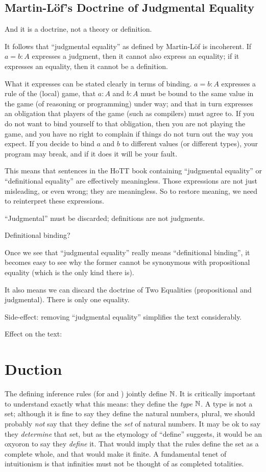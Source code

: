 \documentclass{article}
\begin{document}
\subsection{Martin-Löf's Doctrine of Judgmental Equality}

And it is a doctrine, not a theory or definition.

It follows that ``judgmental equality'' as defined by Martin-Löf is
incoherent. If \(a=b:A\) expresses a judgment, then it cannot also
express an equality; if it expresses an equality, then it cannot be a
definition.

What it expresses can be stated clearly in terms of binding. \(a=b:A\)
expresses a rule of the (local) game, that \(a:A\) and \(b:A\) must be
bound to the same value in the game (of reasoning or programming)
under way; and that in turn expresses an obligation that players of
the game (such as compilers) must agree to. If you do not want to bind
yourself to that obligation, then you are not playing the game, and
you have no right to complain if things do not turn out the way you
expect. If you decide to bind \(a\) and \(b\) to different values (or
different types), your program may break, and if it does it will be
your fault.

This means that sentences in the HoTT book containing ``judgmental
equality'' or ``definitional equality'' are effectively meaningless.
Those expressions are not just misleading, or even wrong; they are
meaningless. So to restore meaning, we need to reinterpret these
expressions.

``Judgmental'' must be discarded; definitions are not judgments.

Definitional binding?

Once we see that ``judgmental equality'' really means ``definitional
binding'', it becomes easy to see why the former cannot be synonymous
with propositional equality (which is the only kind there is).

It also means we can discard the doctrine of Two Equalities
(propositional and judgmental). There is only one equality.

Side-effect: removing ``judgmental equality'' simplifies the text
considerably.

Effect on the text:


\section{Duction}

The defining inference rules (for \Znat and \Snat) jointly define
\(\mathbb{N}\). It is critically important to understand exactly what this
means: they define the \textit{type} \(\mathbb{N}\). A type is not a set;
although it is fine to say they define the natural number\textit{s},
plural, we should probably \textit{not} say that they define the
\textit{set} of natural numbers. It may be ok to say they
\textit{determine} that set, but as the etymology of ``define''
suggests, it would be an oxyoron to say they \textit{define} it. That
would imply that the rules define the set as a complete whole, and
that would make it finite. A fundamental tenet of intuitionism is that
infinities must not be thought of as completed totalities.
\end{document}
